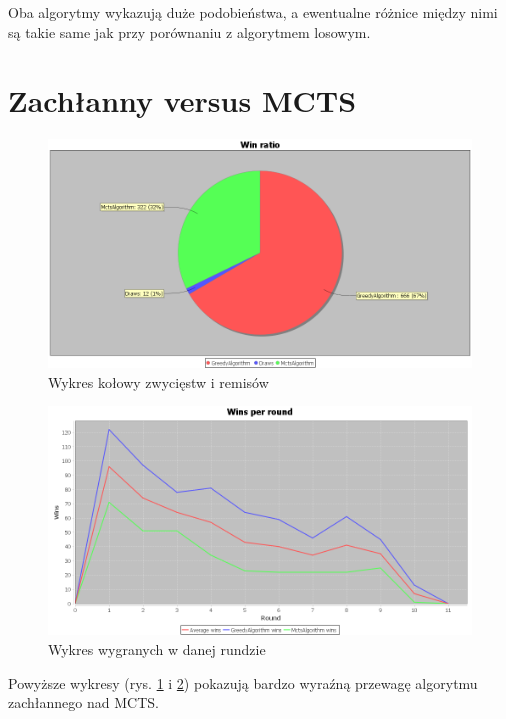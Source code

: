 Oba algorytmy wykazują duże podobieństwa, a ewentualne różnice między nimi są takie same jak przy porównaniu z algorytmem losowym.
\clearpage
\section{Zachłanny versus MCTS}

\begin{figure}[H]
	\centering
	\includegraphics[width=\textwidth]{Resources/MirrorMctsVG/GVsMctsWin.PNG}
	\caption{Wykres kołowy zwycięstw i remisów} 
	\label{fig:GVsMctsWin}
\end{figure}

\begin{figure}[H]
	\centering
	\includegraphics[width=\textwidth]{Resources/MirrorMctsVG/GVsMctsRoundWin.PNG}
	\caption{Wykres wygranych w danej rundzie} 
	\label{fig:GVsMctsRoundWin}
\end{figure}

Powyższe wykresy (rys. \ref{fig:GVsMctsWin} i \ref{fig:GVsMctsRoundWin}) pokazują bardzo wyraźną przewagę algorytmu zachłannego nad MCTS.

